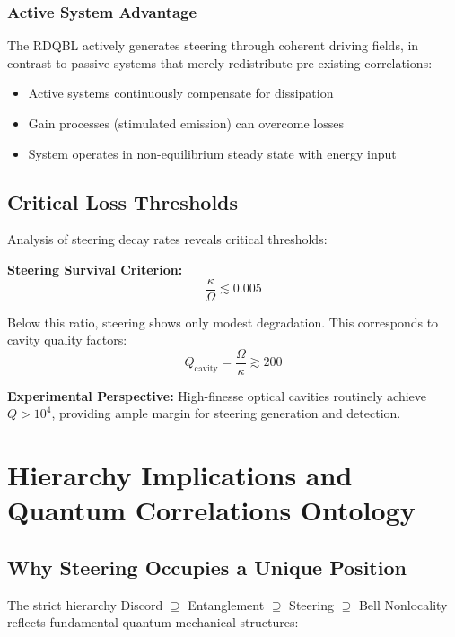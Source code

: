 \subsubsection{Active System Advantage}

The RDQBL actively generates steering through coherent driving fields, in contrast to passive systems that merely redistribute pre-existing correlations:
\begin{itemize}
	\item Active systems continuously compensate for dissipation
	\item Gain processes (stimulated emission) can overcome losses
	\item System operates in non-equilibrium steady state with energy input
\end{itemize}

\subsection{Critical Loss Thresholds}

Analysis of steering decay rates reveals critical thresholds:

\textbf{Steering Survival Criterion:}
\begin{equation}
\frac{\kappa}{\Omega} \lesssim 0.005
\end{equation}

Below this ratio, steering shows only modest degradation. This corresponds to cavity quality factors:
\begin{equation}
Q_{\text{cavity}} = \frac{\Omega}{\kappa} \gtrsim 200
\end{equation}

\textbf{Experimental Perspective:} High-finesse optical cavities routinely achieve $Q > 10^4$, providing ample margin for steering generation and detection.

\section{Hierarchy Implications and Quantum Correlations Ontology}

\subsection{Why Steering Occupies a Unique Position}

The strict hierarchy Discord $\supseteq$ Entanglement $\supseteq$ Steering $\supseteq$ Bell Nonlocality reflects fundamental quantum mechanical structures:

